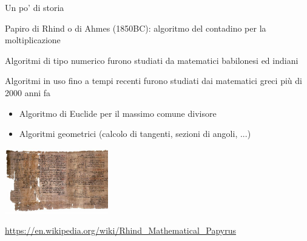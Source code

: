 \begin{frame}{Un po' di storia}
\BIL
\item Papiro di Rhind o di Ahmes (1850BC): algoritmo del contadino per la moltiplicazione
\item Algoritmi di tipo numerico furono studiati da matematici babilonesi ed indiani
\item Algoritmi in uso fino a tempi recenti furono studiati dai matematici greci più di 2000 anni fa
\begin{itemize}
\item Algoritmo di Euclide per il massimo comune divisore
\item Algoritmi geometrici (calcolo di tangenti, sezioni di angoli, ...)
\EIL
\end{itemize}

\begin{center}
\includegraphics[width=4.5cm]{papyrus.jpg}
\end{center}
\tiny
\vspace{-6pt}
\url{https://en.wikipedia.org/wiki/Rhind_Mathematical_Papyrus}
\end{frame}


